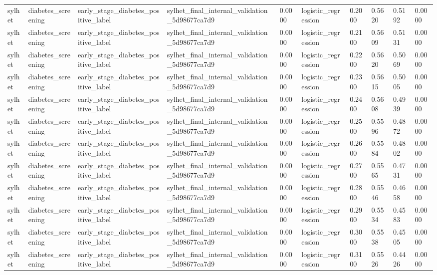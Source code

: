 \begin{tabular}{llllllllll}
sylhet & diabetes\_screening & early\_stage\_diabetes\_positive\_label & sylhet\_final\_internal\_validation\_5d98677ca7d9 & 0.0000 & logistic\_regression & 0.2000 & 0.5620 & 0.5192 & 0.0000 \\
sylhet & diabetes\_screening & early\_stage\_diabetes\_positive\_label & sylhet\_final\_internal\_validation\_5d98677ca7d9 & 0.0000 & logistic\_regression & 0.2100 & 0.5609 & 0.5131 & 0.0000 \\
sylhet & diabetes\_screening & early\_stage\_diabetes\_positive\_label & sylhet\_final\_internal\_validation\_5d98677ca7d9 & 0.0000 & logistic\_regression & 0.2200 & 0.5620 & 0.5069 & 0.0000 \\
sylhet & diabetes\_screening & early\_stage\_diabetes\_positive\_label & sylhet\_final\_internal\_validation\_5d98677ca7d9 & 0.0000 & logistic\_regression & 0.2300 & 0.5615 & 0.5005 & 0.0000 \\
sylhet & diabetes\_screening & early\_stage\_diabetes\_positive\_label & sylhet\_final\_internal\_validation\_5d98677ca7d9 & 0.0000 & logistic\_regression & 0.2400 & 0.5608 & 0.4939 & 0.0000 \\
sylhet & diabetes\_screening & early\_stage\_diabetes\_positive\_label & sylhet\_final\_internal\_validation\_5d98677ca7d9 & 0.0000 & logistic\_regression & 0.2500 & 0.5596 & 0.4872 & 0.0000 \\
sylhet & diabetes\_screening & early\_stage\_diabetes\_positive\_label & sylhet\_final\_internal\_validation\_5d98677ca7d9 & 0.0000 & logistic\_regression & 0.2600 & 0.5584 & 0.4802 & 0.0000 \\
sylhet & diabetes\_screening & early\_stage\_diabetes\_positive\_label & sylhet\_final\_internal\_validation\_5d98677ca7d9 & 0.0000 & logistic\_regression & 0.2700 & 0.5565 & 0.4731 & 0.0000 \\
sylhet & diabetes\_screening & early\_stage\_diabetes\_positive\_label & sylhet\_final\_internal\_validation\_5d98677ca7d9 & 0.0000 & logistic\_regression & 0.2800 & 0.5546 & 0.4658 & 0.0000 \\
sylhet & diabetes\_screening & early\_stage\_diabetes\_positive\_label & sylhet\_final\_internal\_validation\_5d98677ca7d9 & 0.0000 & logistic\_regression & 0.2900 & 0.5534 & 0.4583 & 0.0000 \\
sylhet & diabetes\_screening & early\_stage\_diabetes\_positive\_label & sylhet\_final\_internal\_validation\_5d98677ca7d9 & 0.0000 & logistic\_regression & 0.3000 & 0.5538 & 0.4505 & 0.0000 \\
sylhet & diabetes\_screening & early\_stage\_diabetes\_positive\_label & sylhet\_final\_internal\_validation\_5d98677ca7d9 & 0.0000 & logistic\_regression & 0.3100 & 0.5526 & 0.4426 & 0.0000 \\

\end{tabular}
